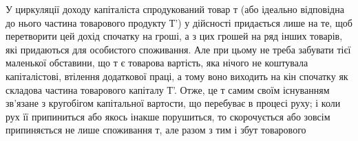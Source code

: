 У циркуляції доходу капіталіста спродукований товар т (або ідеально
відповідна до нього частина товарового продукту Т') у дійсності придається
лише на те, щоб перетворити цей дохід спочатку на гроші, а з цих
грошей на ряд інших товарів, які придаються для особистого споживання.
Але при цьому не треба забувати тієї маленької обставини, що т є товарова
вартість, яка нічого не коштувала капіталістові, втілення додаткової
праці, а тому воно виходить на кін спочатку як складова частина товарового
капіталу Т'. Отже, це т самим своїм існуванням зв’язане з кругобігом
капітальної вартости, що перебуває в процесі руху; і коли рух
її припиниться або якось інакше порушиться, то скорочується або зовсім
припиняється не лише споживання т, але разом з тим і збут товарового
\parbreak{}  %
